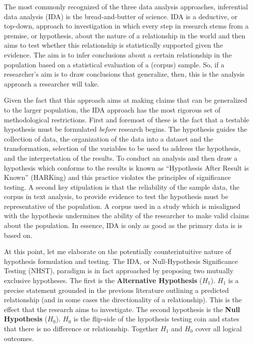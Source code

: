 \documentclass[
]{article}
\begin{document}
The most commonly recognized of the three data analysis approaches, inferential data analysis (IDA) is the bread-and-butter of science. IDA is a deductive, or top-down, approach to investigation in which every step in research stems from a premise, or hypothesis, about the nature of a relationship in the world and then aims to test whether this relationship is statistically supported given the evidence. The aim is to infer conclusions about a certain relationship in the population based on a statistical evaluation of a (corpus) sample. So, if a researcher's aim is to draw conclusions that generalize, then, this is the analysis approach a researcher will take.

Given the fact that this approach aims at making claims that can be generalized to the larger population, the IDA approach has the most rigorous set of methodological restrictions. First and foremost of these is the fact that a testable hypothesis must be formulated \emph{before} research begins. The hypothesis guides the collection of data, the organization of the data into a dataset and the transformation, selection of the variables to be used to address the hypothesis, and the interpretation of the results. To conduct an analysis and then draw a hypothesis which conforms to the results is known as ``Hypothesis After Result is Known'' (HARKing) \citep{Kerr1998} and this practice violates the principles of significance testing. A second key stipulation is that the reliability of the sample data, the corpus in text analysis, to provide evidence to test the hypothesis must be representative of the population. A corpus used in a study which is misaligned with the hypothesis undermines the ability of the researcher to make valid claims about the population. In essence, IDA is only as good as the primary data is is based on.

At this point, let me elaborate on the potentially counterintuitive nature of hypothesis formulation and testing. The IDA, or Null-Hypothesis Significance Testing (NHST), paradigm is in fact approached by proposing two mutually exclusive hypotheses. The first is the \textbf{Alternative Hypothesis} (\(H_1\)). \(H_1\) is a precise statement grounded in the previous literature outlining a predicted relationship (and in some cases the directionality of a relationship). This is the effect that the research aims to investigate. The second hypothesis is the \textbf{Null Hypothesis} (\(H_0\)). \(H_0\) is the flip-side of the hypothesis testing coin and states that there is no difference or relationship. Together \(H_1\) and \(H_0\) cover all logical outcomes.
\end{document}
